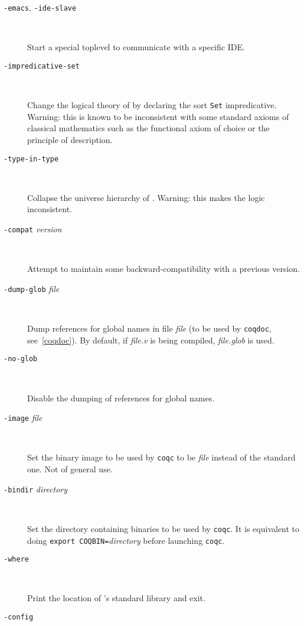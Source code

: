 \begin{description}
\item[{\tt -emacs}, {\tt -ide-slave}]\ %

  Start a special toplevel to communicate with a specific IDE.

\item[{\tt -impredicative-set}]\ %

  Change the logical theory of {\Coq} by declaring the sort {\tt Set}
  impredicative. Warning: this is known to be inconsistent with
  some standard axioms of classical mathematics such as the functional
  axiom of choice or the principle of description.

\item[{\tt -type-in-type}]\ %

  Collapse the universe hierarchy of {\Coq}. Warning: this makes the
  logic inconsistent.

\item[{\tt -compat} {\em version}]\ %

  Attempt to maintain some backward-compatibility with a previous version.

\item[{\tt -dump-glob} {\em file}]\ %

  Dump references for global names in file {\em file} (to be used
  by {\tt coqdoc}, see~\ref{coqdoc}). By default, if {\em file.v} is being
  compiled, {\em file.glob} is used.

\item[{\tt -no-glob}]\ %

  Disable the dumping of references for global names.


\item[{\tt -image} {\em file}]\ %

  Set the binary image to be used by {\tt coqc} to be {\em file}
  instead of the standard one. Not of general use.

\item[{\tt -bindir} {\em directory}]\ %

  Set the directory containing {\Coq} binaries to be used by {\tt coqc}.
  It is equivalent to doing \texttt{export COQBIN=}{\em directory} before
  launching {\tt coqc}.

\item[{\tt -where}]\ %

  Print the location of \Coq's standard library and exit.

\item[{\tt -config}]\ %


\end{description}
